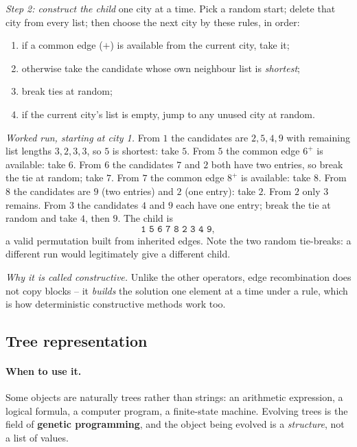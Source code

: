 \documentclass[11pt,a4paper]{article}
\begin{document}
\emph{Step 2: construct the child} one city at a time. Pick a random start;
delete that city from every list; then choose the next city by these rules,
in order:
\begin{enumerate}
\item if a common edge ($+$) is available from the current city, take it;
\item otherwise take the candidate whose own neighbour list is
      \emph{shortest};
\item break ties at random;
\item if the current city's list is empty, jump to any unused city at random.
\end{enumerate}

\emph{Worked run, starting at city 1.} From $1$ the candidates are
$2,5,4,9$ with remaining list lengths $3,2,3,3$, so $5$ is shortest: take
$5$. From $5$ the common edge $6^+$ is available: take $6$. From $6$ the
candidates $7$ and $2$ both have two entries, so break the tie at random;
take $7$. From $7$ the common edge $8^+$ is available: take $8$. From $8$ the
candidates are $9$ (two entries) and $2$ (one entry): take $2$. From $2$ only
$3$ remains. From $3$ the candidates $4$ and $9$ each have one entry; break
the tie at random and take $4$, then $9$. The child is
\[
  \texttt{1\ 5\ 6\ 7\ 8\ 2\ 3\ 4\ 9},
\]
a valid permutation built from inherited edges. Note the two random
tie-breaks: a different run would legitimately give a different child.

\emph{Why it is called constructive.} Unlike the other operators, edge
recombination does not copy blocks -- it \emph{builds} the solution
one element at a time under a rule, which is how deterministic constructive
methods work too.

\subsection{Tree representation}

\paragraph{When to use it.}
Some objects are naturally trees rather than strings: an arithmetic
expression, a logical formula, a computer program, a finite-state machine.
Evolving trees is the field of \textbf{genetic programming}, and the object
being evolved is a \emph{structure}, not a list of values.
\end{document}
